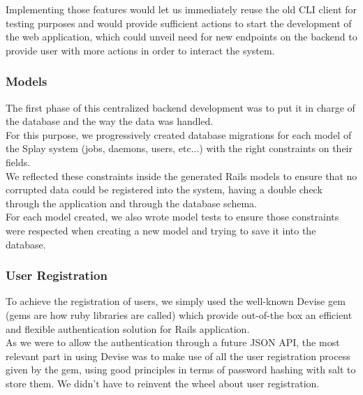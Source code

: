 \documentclass{eplmastersthesis}
\begin{document}
        Implementing those features would let us immediately reuse the old
        CLI client for testing purposes and would provide sufficient actions
        to start the development of the web application, which could unveil
        need for new endpoints on the backend to provide user with more
        actions in order to interact the system.\\

        \subsubsection{Models}

          The first phase of this centralized backend development was to
          put it in charge of the database and the way the data was handled.\\

          For this purpose, we progressively created database migrations
          for each model of the Splay system (jobs, daemons, users, etc...)
          with the right constraints on their fields.\\
          We reflected these constraints inside the generated Rails models to
          ensure that no corrupted data could be registered into the system,
          having a double check through the application and through the
          database schema.\\
          For each model created, we also wrote model tests to ensure those
          constraints were respected when creating a new model and trying
          to save it into the database.

        \subsubsection{User Registration}

          To achieve the registration of users, we simply used the
          well-known Devise \cite{devise} gem (gems are how ruby libraries are
          called) which provide out-of-the box an efficient and flexible
          authentication solution for Rails application.\\
          As we were to allow the authentication through a future JSON API,
          the most relevant part in using Devise was to make use of all
          the user registration process given by the gem, using good principles
          in terms of password hashing with salt to store them. We didn't
          have to reinvent the wheel about user registration.\\
\end{document}
